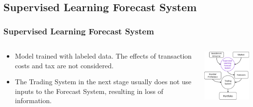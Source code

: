 \subsection{Supervised Learning Forecast System}
\begin{frame}
\frametitle{Supervised Learning Forecast System}
\begin{columns}
\begin{column}{0.55\textwidth}
\begin{itemize}
\item
Model trained with labeled data. 
The effects of transaction costs and tax are not considered.
\item
The Trading System in the next stage usually does not use inputs to the Forecast System, resulting in loss of information.
\end{itemize}
\end{column}
\begin{column}{0.45\textwidth}
\begin{center}
\includegraphics[width=4.8cm]{images/supervised_learning.png}
\end{center}
\end{column}
\end{columns}
\end{frame}


